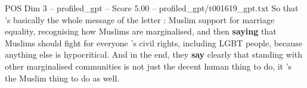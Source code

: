 \begin{textsample}{POS Dim 3 – profiled\_gpt – Score 5.00 – profiled\_gpt/t001619\_gpt.txt}
So that ’s basically the whole message of the letter : Muslim support for marriage equality, recognising how Muslims are marginalised, and then \textbf{saying} that Muslims should fight for everyone ’s civil rights, including LGBT people, because anything else is hypocritical.
And in the end, they \textbf{say} clearly that standing with other marginalised communities is not just the decent human thing to do, it ’s the Muslim thing to do as well.

\end{textsample}
